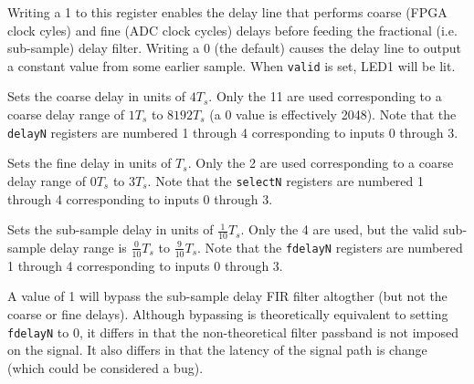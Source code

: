 \documentclass[12pt]{article}
\begin{document}
\begin{description}

 Writing a 1 to this register enables the delay line that performs
coarse (FPGA clock cyles) and fine (ADC clock cycles) delays before feeding the
fractional (i.e. sub-sample) delay filter.  Writing a 0 (the default) causes
the delay line to output a constant value from some earlier sample.  When
\verb|valid| is set, LED1 will be lit.

\filbreak
{}
 Sets the coarse delay in units of $4 T_s$.  Only the 11 \LSbs
are used corresponding to a coarse delay range of $1 T_s$ to $8192 T_s$ (a 0
value is effectively 2048).  Note that the \verb|delayN| registers are numbered
1 through 4 corresponding to inputs 0 through 3.

\filbreak
{}
 Sets the fine delay in units of $T_s$.  Only the 2 \LSbs
are used corresponding to a coarse delay range of $0 T_s$ to $3 T_s$.  Note
that the \verb|selectN| registers are numbered 1 through 4 corresponding to
inputs 0 through 3.

\filbreak
{}
 Sets the sub-sample delay in units of $\frac{1}{10}T_s$.  Only
the 4 \LSbs are used, but the valid sub-sample delay range is
$\frac{0}{10} T_s$ to $\frac{9}{10} T_s$.  Note that the \verb|fdelayN|
registers are numbered 1 through 4 corresponding to inputs 0 through 3.

\filbreak
{}
 A value of 1 will bypass the sub-sample delay FIR filter
altogther (but not the coarse or fine delays).  Although bypassing is
theoretically equivalent to setting \verb|fdelayN| to 0, it differs in that the
non-theoretical filter passband is not imposed on the signal.  It also differs
in that the latency of the signal path is change (which could be considered a
bug).

\end{description}
\end{document}

